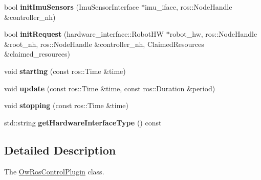 \begin{DoxyCompactItemize}
\item 
bool {\bfseries init\+Imu\+Sensors} (Imu\+Sensor\+Interface $\ast$imu\+\_\+iface, ros\+::\+Node\+Handle \&controller\+\_\+nh)\hypertarget{classow__ros__control__plugin_1_1OwRosControlPlugin_a06b9057748033e6176230ec801c3a0e3}{}\label{classow__ros__control__plugin_1_1OwRosControlPlugin_a06b9057748033e6176230ec801c3a0e3}

\item 
bool {\bfseries init\+Request} (hardware\+\_\+interface\+::\+Robot\+HW $\ast$robot\+\_\+hw, ros\+::\+Node\+Handle \&root\+\_\+nh, ros\+::\+Node\+Handle \&controller\+\_\+nh, Claimed\+Resources \&claimed\+\_\+resources)\hypertarget{classow__ros__control__plugin_1_1OwRosControlPlugin_a900b0214c2c992f82abc06daea317894}{}\label{classow__ros__control__plugin_1_1OwRosControlPlugin_a900b0214c2c992f82abc06daea317894}

\item 
void {\bfseries starting} (const ros\+::\+Time \&time)\hypertarget{classow__ros__control__plugin_1_1OwRosControlPlugin_a1c2b0b1ed37112373dd1f0607aa02a38}{}\label{classow__ros__control__plugin_1_1OwRosControlPlugin_a1c2b0b1ed37112373dd1f0607aa02a38}

\item 
void {\bfseries update} (const ros\+::\+Time \&time, const ros\+::\+Duration \&period)\hypertarget{classow__ros__control__plugin_1_1OwRosControlPlugin_a7d758a6f4936ec355bcff262ee979604}{}\label{classow__ros__control__plugin_1_1OwRosControlPlugin_a7d758a6f4936ec355bcff262ee979604}

\item 
void {\bfseries stopping} (const ros\+::\+Time \&time)\hypertarget{classow__ros__control__plugin_1_1OwRosControlPlugin_a56e19b8dabc181f365a875577128661b}{}\label{classow__ros__control__plugin_1_1OwRosControlPlugin_a56e19b8dabc181f365a875577128661b}

\item 
std\+::string {\bfseries get\+Hardware\+Interface\+Type} () const \hypertarget{classow__ros__control__plugin_1_1OwRosControlPlugin_a06c957a0767819be554ab23a737249ee}{}\label{classow__ros__control__plugin_1_1OwRosControlPlugin_a06c957a0767819be554ab23a737249ee}

\end{DoxyCompactItemize}


\subsection{Detailed Description}
The \hyperlink{classow__ros__control__plugin_1_1OwRosControlPlugin}{Ow\+Ros\+Control\+Plugin} class. 

